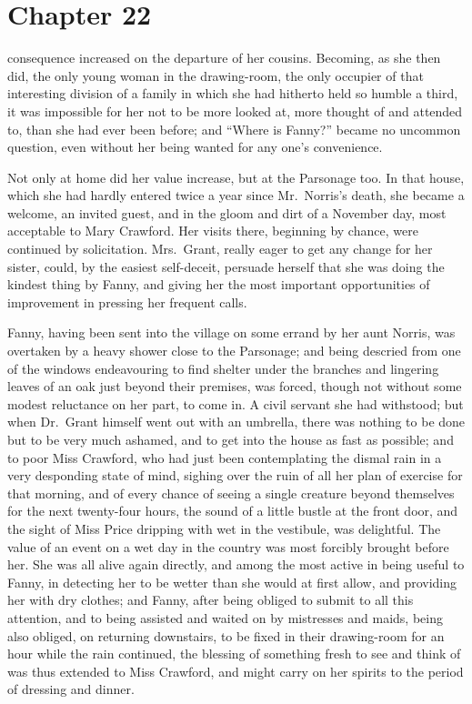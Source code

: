 \chapter{Chapter 22}

 consequence increased on the departure of
her cousins.  Becoming, as she then did, the only young
woman in the drawing-room, the only occupier of that
interesting division of a family in which she had hitherto
held so humble a third, it was impossible for her not
to be more looked at, more thought of and attended to,
than she had ever been before; and ``Where is Fanny?''
became no uncommon question, even without her being
wanted for any one's convenience.

Not only at home did her value increase, but at the
Parsonage too.  In that house, which she had hardly
entered twice a year since Mr.\ Norris's death, she became
a welcome, an invited guest, and in the gloom and dirt
of a November day, most acceptable to Mary Crawford.
Her visits there, beginning by chance, were continued
by solicitation.  Mrs.\ Grant, really eager to get any
change for her sister, could, by the easiest self-deceit,
persuade herself that she was doing the kindest thing
by Fanny, and giving her the most important opportunities
of improvement in pressing her frequent calls.

Fanny, having been sent into the village on some errand
by her aunt Norris, was overtaken by a heavy shower close
to the Parsonage; and being descried from one of the
windows endeavouring to find shelter under the branches
and lingering leaves of an oak just beyond their premises,
was forced, though not without some modest reluctance on
her part, to come in.  A civil servant she had withstood;
but when Dr.\ Grant himself went out with an umbrella,
there was nothing to be done but to be very much ashamed,
and to get into the house as fast as possible; and to poor
Miss Crawford, who had just been contemplating the dismal
rain in a very desponding state of mind, sighing over
the ruin of all her plan of exercise for that morning,
and of every chance of seeing a single creature beyond
themselves for the next twenty-four hours, the sound of
a little bustle at the front door, and the sight of Miss
Price dripping with wet in the vestibule, was delightful.
The value of an event on a wet day in the country was
most forcibly brought before her.  She was all alive
again directly, and among the most active in being useful
to Fanny, in detecting her to be wetter than she would at
first allow, and providing her with dry clothes; and Fanny,
after being obliged to submit to all this attention,
and to being assisted and waited on by mistresses
and maids, being also obliged, on returning downstairs,
to be fixed in their drawing-room for an hour while
the rain continued, the blessing of something fresh
to see and think of was thus extended to Miss Crawford,
and might carry on her spirits to the period of dressing
and dinner.

